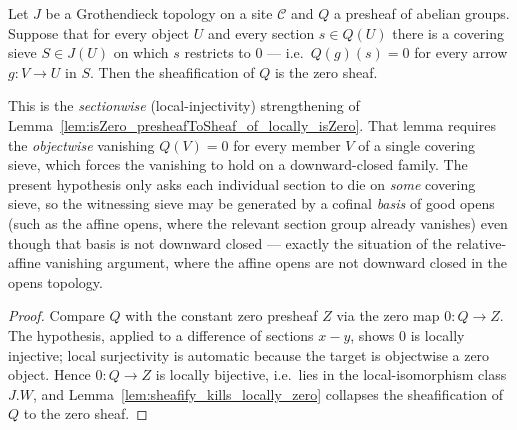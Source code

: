 \begin{lemma}\leanok
  \label{lem:isZero_presheafToSheaf_of_sections_locally_zero}
  Let \(J\) be a Grothendieck topology on a site \(\mathcal{C}\) and \(Q\) a presheaf of
  abelian groups. Suppose that for every object \(U\) and every section \(s \in Q(U)\) there
  is a covering sieve \(S \in J(U)\) on which \(s\) restricts to \(0\) --- i.e.\ \(Q(g)(s) =
  0\) for every arrow \(g : V \to U\) in \(S\). Then the sheafification of \(Q\) is the zero
  sheaf.

  This is the \emph{sectionwise} (local-injectivity) strengthening of
  Lemma~\ref{lem:isZero_presheafToSheaf_of_locally_isZero}. That lemma requires the
  \emph{objectwise} vanishing \(Q(V) = 0\) for every member \(V\) of a single covering sieve,
  which forces the vanishing to hold on a downward-closed family. The present hypothesis only
  asks each individual section to die on \emph{some} covering sieve, so the witnessing sieve
  may be generated by a cofinal \emph{basis} of good opens (such as the affine opens, where
  the relevant section group already vanishes) even though that basis is not downward closed
  --- exactly the situation of the relative-affine vanishing argument, where the affine opens
  are not downward closed in the opens topology.
\end{lemma}
\begin{proof}
  \leanok
  Compare \(Q\) with the constant zero presheaf \(Z\) via the zero map \(0 : Q \to Z\). The
  hypothesis, applied to a difference of sections \(x - y\), shows \(0\) is locally injective;
  local surjectivity is automatic because the target is objectwise a zero object. Hence \(0 :
  Q \to Z\) is locally bijective, i.e.\ lies in the local-isomorphism class \(J.W\), and
  Lemma~\ref{lem:sheafify_kills_locally_zero} collapses the sheafification of \(Q\) to the
  zero sheaf.
\end{proof}

